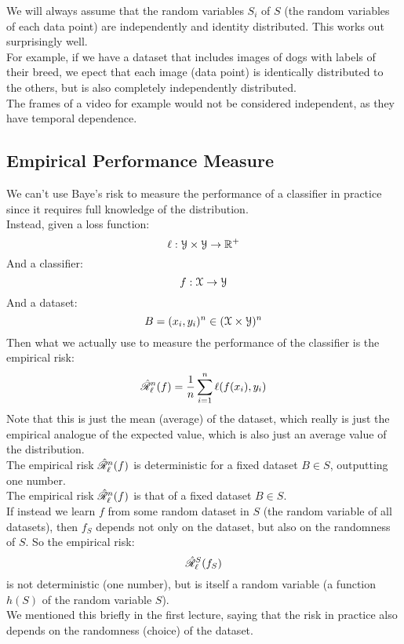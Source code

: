 \documentclass[12pt]{article}
\begin{document}
We will always assume that the random variables
$S_i$ of $S$
(the random variables of each data point)
are independently and identity distributed.
This works out surprisingly well. \\

For example,
if we have a dataset that includes images
of dogs with labels of their breed,
we epect that each image (data point)
is identically distributed to the others,
but is also completely independently
distributed. \\
The frames of a video for example would not
be considered independent,
as they have temporal dependence. \\

\newpage

\subsection*{Empirical Performance Measure}

We can't use Baye's risk to measure the performance
of a classifier in practice since
it requires full knowledge of the distribution. \\

Instead, given a loss function:
\[ \ell: \mathcal{Y}\times \mathcal{Y}\to \mathbb{R}^+ \]
And a classifier:
\[ f: \mathcal{X}\to \mathcal{Y}\]
And a dataset:
\[ B = (x_i, y_i)^n \in (\mathcal{X}\times \mathcal{Y})^n \]
Then what we actually use to measure the performance
of the classifier is the empirical risk:
\[ \hat{\mathscr{R}}_\ell^n(f)
= \dfrac{1}{n}\sum_{i = 1}^{n}\ell(f(x_i), y_i) \]
Note that this is just the mean (average) of the
dataset,
which really is just the empirical analogue
of the expected value, which is also just
an average value of the distribution. \\

The empirical risk $\hat{\mathscr{R}}_\ell^n(f)$
is deterministic for a fixed dataset
$B \in S$,
outputting one number. \\

The empirical risk $\hat{\mathscr{R}}_\ell^n(f)$
is that of a fixed dataset $B \in S$. \\
If instead we learn $f$
from some random dataset in $S$
(the random variable of all datasets),
then $f_S$ depends not only on the dataset,
but also on the randomness of $S$.
So the empirical risk:
\[ \hat{\mathscr{R}}_\ell^S(f_S) \]
is not deterministic (one number),
but is itself a random variable
(a function $h(S)$ of the random 
variable $S$). \\
We mentioned this briefly in the first
lecture, saying that the risk
in practice also depends on the randomness
(choice) of the dataset. \\
\end{document}
